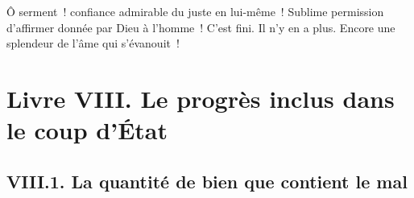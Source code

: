 \documentclass[french,twoside]{book} %
\newcommand\chapteropen{} %
\newcommand\chaptercont{} %
\newcommand\chapterclose{} %
\begin{document}
Ô serment ! confiance admirable du juste en lui-même ! Sublime permission d’affirmer donnée par Dieu à l’homme ! C’est fini. Il n’y en a plus. Encore une splendeur de l’âme qui s’évanouit !
\chapterclose


\chapteropen

\chapter[{Livre VIII. Le progrès inclus dans le coup d’État}]{Livre VIII. Le progrès inclus dans le coup d’État}
\renewcommand{\leftmark}{Livre VIII. Le progrès inclus dans le coup d’État}


\chaptercont

\section[{VIII.1. La quantité de bien que contient le mal}]{VIII.1. La quantité de bien que contient le mal}
\end{document}
